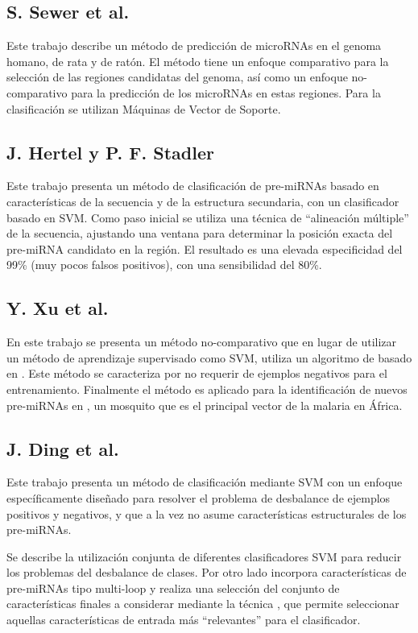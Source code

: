 \documentclass[12pt,bibliography=oldstyle,DIV=12,parskip=half-]{scrreprt}
\begin{document}
\subsection{S. Sewer et al. \cite{sewer}}
Este trabajo describe un método de predicción de microRNAs en el
genoma homano, de rata y de ratón. El método tiene un enfoque
comparativo para la selección de las regiones candidatas del genoma,
así como un enfoque no-comparativo para la predicción de los microRNAs
en estas regiones. Para la clasificación se utilizan Máquinas de
Vector de Soporte.
%
\subsection{J. Hertel y P. F. Stadler \cite{hertel}}
Este trabajo presenta un método de clasificación de pre-miRNAs basado
en características de la secuencia y de la estructura secundaria, con
un clasificador basado en SVM. Como paso inicial se utiliza una
técnica de ``alineación múltiple'' de la secuencia, ajustando una
ventana para determinar la posición exacta del pre-miRNA candidato en
la región.  El resultado es una elevada especificidad del 99\% (muy
pocos falsos positivos), con una sensibilidad del 80\%.
%
\subsection{Y. Xu et al. \cite{xu}}
En este trabajo se presenta un método no-comparativo que en lugar de
utilizar un método de aprendizaje supervisado como SVM, utiliza un
algoritmo de  basado en .  Este método
se caracteriza por no requerir de ejemplos negativos para el
entrenamiento. Finalmente el método es aplicado para la identificación
de nuevos pre-miRNAs en , un mosquito que es el
principal vector de la malaria en África.
%
\subsection{J. Ding et al. \cite{ding}}
Este trabajo presenta un método de clasificación mediante SVM con un
enfoque específicamente diseñado para resolver el problema de
desbalance de ejemplos positivos y negativos, y que a la vez no asume
características estructurales de los pre-miRNAs.

Se describe la utilización conjunta de diferentes clasificadores SVM
para reducir los problemas del desbalance de clases. Por otro lado
incorpora características de pre-miRNAs tipo multi-loop y realiza una
selección del conjunto de características finales a considerar
mediante la técnica , que permite seleccionar aquellas
características de entrada más ``relevantes'' para el clasificador.
%
%
%
%
\end{document}
